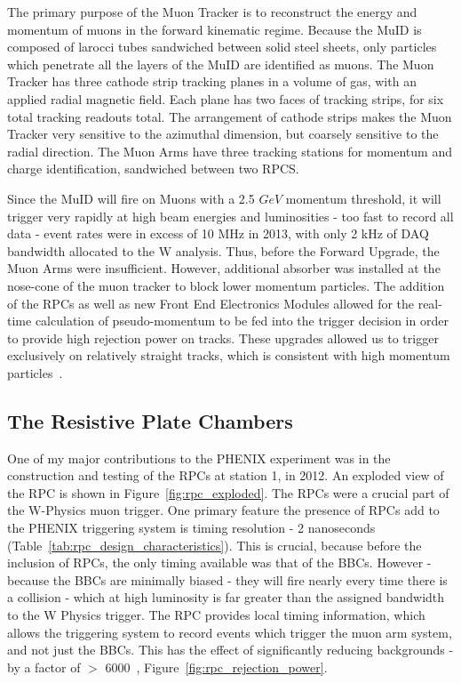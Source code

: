The primary purpose of the Muon Tracker is to reconstruct the energy and
momentum of muons in the forward kinematic regime. Because the MuID is composed
of larocci tubes sandwiched between solid steel sheets, only particles which
penetrate all the layers of the MuID are identified as muons. The Muon Tracker
has three cathode strip tracking planes in a volume of gas, with an applied
radial magnetic field. Each plane has two faces of tracking strips, for six
total tracking readouts total. The arrangement of cathode strips  makes the Muon
Tracker very sensitive to the azimuthal dimension, but coarsely sensitive to the
radial direction. The Muon Arms have three tracking stations for momentum and
charge identification, sandwiched between two RPCS.

Since the MuID will fire on Muons with a 2.5 $GeV$ momentum threshold, it will
trigger very rapidly at high beam energies and luminosities - too fast to record
all data - event rates were in excess of 10 MHz in 2013, with only 2 kHz of DAQ
bandwidth allocated to the W analysis. Thus, before the Forward Upgrade, the
Muon Arms were insufficient. However, additional absorber was installed at the
nose-cone of the muon tracker to block lower momentum particles. The addition of
the RPCs as well as new Front End Electronics Modules allowed for the real-time
calculation of pseudo-momentum to be fed into the trigger decision in order to
provide high rejection power on tracks. These upgrades allowed us to trigger
exclusively on relatively straight tracks, which is consistent with high
momentum particles~\cite{Fukao2011}.

\clearpage
\subsection{The Resistive Plate Chambers}

One of my major contributions to the PHENIX experiment was in the construction
and testing of the RPCs at station 1, in 2012. An exploded view of the RPC is
shown in Figure~\ref{fig:rpc_exploded}. The RPCs were a crucial part of the
W-Physics muon trigger. One primary feature the presence of RPCs add to the
PHENIX triggering system is timing resolution - 2 nanoseconds
(Table~\ref{tab:rpc_design_characteristics}). This is crucial, because before
the inclusion of RPCs, the only timing available was that of the BBCs. However -
because the BBCs are minimally biased - they will fire nearly every time there
is a collision - which at high luminosity is far greater than the assigned
bandwidth to the W Physics trigger. The RPC provides local timing information,
which allows the triggering system to record events which trigger the muon arm
system, and not just the BBCs. This has the effect of significantly reducing
backgrounds - by a factor of $>$ 6000~\cite{Fukao2011},
Figure~\ref{fig:rpc_rejection_power}.

